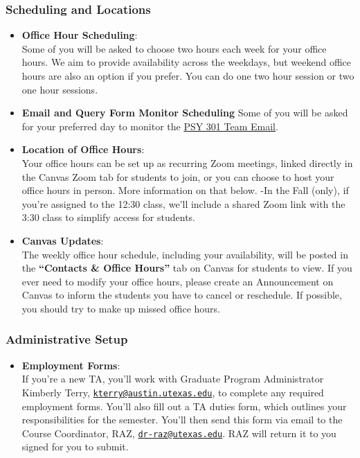 \documentclass[
]{article}
\providecommand{\tightlist}{%
  \setlength{\itemsep}{0pt}\setlength{\parskip}{0pt}}
\begin{document}
\hypertarget{scheduling-and-locations}{%
\subsubsection{Scheduling and Locations}\label{scheduling-and-locations}}

\begin{itemize}
\item
  \textbf{Office Hour Scheduling}:\\
  Some of you will be asked to choose two hours each week for your office hours. We aim to provide availability across the weekdays, but weekend office hours are also an option if you prefer. You can do one two hour session or two one hour sessions.
\item
  \textbf{Email and Query Form Monitor Scheduling}
  Some of you will be asked for your preferred day to monitor the \protect\hyperlink{emails}{PSY 301 Team Email}.
\item
  \textbf{Location of Office Hours}:\\
  Your office hours can be set up as recurring Zoom meetings, linked directly in the Canvas Zoom tab for students to join, or you can choose to host your office hours in person. More information on that below.
  -In the Fall (only), if you're assigned to the 12:30 class, we'll include a shared Zoom link with the 3:30 class to simplify access for students.
\item
  \textbf{Canvas Updates}:\\
  The weekly office hour schedule, including your availability, will be posted in the \textbf{``Contacts \& Office Hours''} tab on Canvas for students to view. If you ever need to modify your office hours, please create an Announcement on Canvas to inform the students you have to cancel or reschedule. If possible, you should try to make up missed office hours.
\end{itemize}

\hypertarget{administrative-setup}{%
\subsubsection{Administrative Setup}\label{administrative-setup}}

\begin{itemize}
\tightlist
\item
  \textbf{Employment Forms}:\\
  If you're a new TA, you'll work with Graduate Program Administrator Kimberly Terry, \href{mailto:kterry@austin.utexas.edu}{\nolinkurl{kterry@austin.utexas.edu}}, to complete any required employment forms. You'll also fill out a TA duties form, which outlines your responsibilities for the semester. You'll then send this form via email to the Course Coordinator, RAZ, \href{mailto:dr-raz@utexas.edu}{\nolinkurl{dr-raz@utexas.edu}}. RAZ will return it to you signed for you to submit.
\end{itemize}
\end{document}
